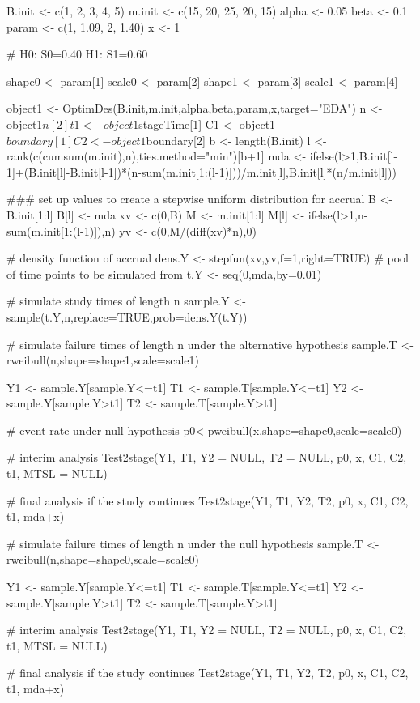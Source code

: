 \begin{Examples}
\begin{ExampleCode}
B.init <- c(1, 2, 3, 4, 5)
m.init <- c(15, 20, 25, 20, 15)
alpha <- 0.05
beta <- 0.1
param <- c(1, 1.09, 2, 1.40)
x <- 1

# H0: S0=0.40 H1: S1=0.60

shape0 <- param[1]
scale0 <- param[2]
shape1 <- param[3]
scale1 <- param[4]

object1 <- OptimDes(B.init,m.init,alpha,beta,param,x,target="EDA")
n <- object1$n[2]
t1 <- object1$stageTime[1]
C1 <- object1$boundary[1]
C2 <- object1$boundary[2]
b <- length(B.init)
l <- rank(c(cumsum(m.init),n),ties.method="min")[b+1]
mda <- ifelse(l>1,B.init[l-1]+(B.init[l]-B.init[l-1])*(n-sum(m.init[1:(l-1)]))/m.init[l],B.init[l]*(n/m.init[l]))

### set up values to create a stepwise uniform distribution for accrual
B <- B.init[1:l]
B[l] <- mda
xv <- c(0,B)
M <- m.init[1:l]
M[l] <- ifelse(l>1,n-sum(m.init[1:(l-1)]),n)
yv <- c(0,M/(diff(xv)*n),0)

# density function of accrual 
dens.Y <- stepfun(xv,yv,f=1,right=TRUE)
# pool of time points to be simulated from
t.Y <- seq(0,mda,by=0.01)

# simulate study times of length n
sample.Y <- sample(t.Y,n,replace=TRUE,prob=dens.Y(t.Y))

# simulate failure times of length n under the alternative hypothesis
sample.T <- rweibull(n,shape=shape1,scale=scale1)

Y1 <- sample.Y[sample.Y<=t1]
T1 <- sample.T[sample.Y<=t1]
Y2 <- sample.Y[sample.Y>t1]
T2 <- sample.T[sample.Y>t1]

# event rate under null hypothesis
p0<-pweibull(x,shape=shape0,scale=scale0)

# interim analysis
Test2stage(Y1, T1, Y2 = NULL, T2 = NULL, p0, x, C1, C2, t1, MTSL = NULL)

# final analysis if the study continues
Test2stage(Y1, T1, Y2, T2, p0, x, C1, C2, t1, mda+x)

# simulate failure times of length n under the null hypothesis
sample.T <- rweibull(n,shape=shape0,scale=scale0)

Y1 <- sample.Y[sample.Y<=t1]
T1 <- sample.T[sample.Y<=t1]
Y2 <- sample.Y[sample.Y>t1]
T2 <- sample.T[sample.Y>t1]

# interim analysis
Test2stage(Y1, T1, Y2 = NULL, T2 = NULL, p0, x, C1, C2, t1, MTSL = NULL)

# final analysis if the study continues
Test2stage(Y1, T1, Y2, T2, p0, x, C1, C2, t1, mda+x)

\end{ExampleCode}
\end{Examples}

